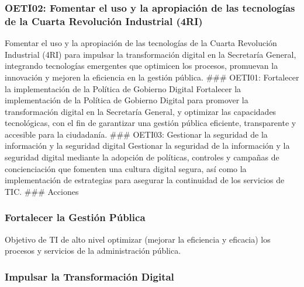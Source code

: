 \documentclass[
	a4paper, %
	12pt, %
]{include/CSSullivanBusinessReport}
\begin{document}
\subsubsection{OETI02: Fomentar el uso y la apropiación de las
tecnologías de la Cuarta Revolución Industrial
(4RI)}\label{sec:oeti02-fomentar-el-uso-y-la-apropiaciuxf3n-de-las-tecnologuxedas-de-la-cuarta-revoluciuxf3n-industrial-4ri}

Fomentar el uso y la apropiación de las tecnologías de la Cuarta
Revolución Industrial (4RI) para impulsar la transformación digital en
la Secretaría General, integrando tecnologías emergentes que optimicen
los procesos, promuevan la innovación y mejoren la eficiencia en la
gestión pública. \#\#\# OETI01: Fortalecer la implementación de la
Política de Gobierno Digital Fortalecer la implementación de la Política
de Gobierno Digital para promover la transformación digital en la
Secretaría General, y optimizar las capacidades tecnológicas, con el fin
de garantizar una gestión pública eficiente, transparente y accesible
para la ciudadanía. \#\#\# OETI03: Gestionar la seguridad de la
información y la seguridad digital Gestionar la seguridad de la
información y la seguridad digital mediante la adopción de políticas,
controles y campañas de concienciación que fomenten una cultura digital
segura, así como la implementación de estrategias para asegurar la
continuidad de los servicios de TIC. \#\#\# Acciones

\subsubsection{Fortalecer la Gestión
Pública}\label{sec:fortalecer-la-gestiuxf3n-puxfablica}

Objetivo de TI de alto nivel optimizar (mejorar la eficiencia y
eficacia) los procesos y servicios de la administración pública.

\subsubsection{Impulsar la Transformación
Digital}\label{sec:impulsar-la-transformaciuxf3n-digital}
\end{document}
